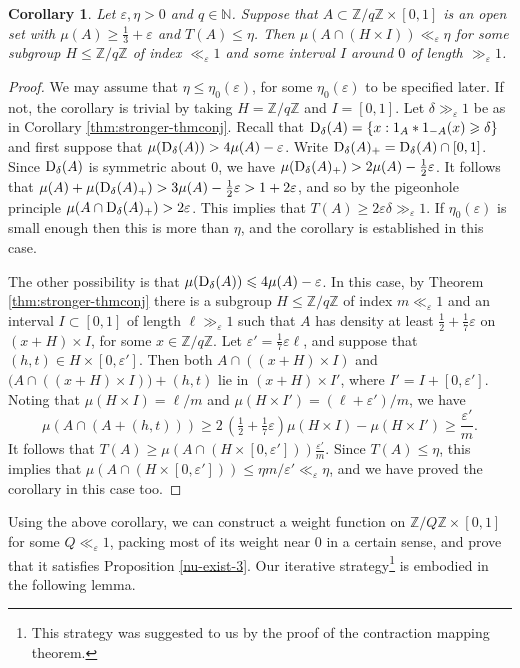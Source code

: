 \documentclass[10pt,reqno]{amsart}
\newtheorem{corollary}[theorem]{Corollary}
\theoremstyle{definition}
\theoremstyle{remark}
\renewcommand{\leq}{\leqslant}
\renewcommand{\geq}{\geqslant}
\def\Z{\mathbb{Z}}
\def\N{\mathbb{N}}
\def\eps{\varepsilon}
\numberwithin{equation}{section}
\begin{document}
\begin{corollary}\label{cor4.2}
Let $\eps,\eta > 0$ and $q \in \N$. Suppose that $A\subset\Z/q\Z\times[0,1]$ is an open set with $\mu(A)\geq\frac{1}{3} + \eps$ and $T(A)\leq\eta$. Then $\mu(A\cap (H\times I)) \ll_{\eps} \eta$ for some subgroup $H\leq\Z/q\Z$ of index $\ll_{\eps} 1$ and some interval $I$ around $0$ of length $\gg_{\eps} 1$.
\end{corollary}
\begin{proof} We may assume that $\eta \leq \eta_0(\eps)$, for some $\eta_0(\eps)$ to be specified later. If not, the corollary is trivial by taking $H = \Z/q\Z$ and $I = [0,1]$. Let $\delta\gg_\eps 1$ be as in Corollary \ref{thm:stronger-thmconj}. Recall that $\Sym_{\delta}(A) = \{ x: 1_A\ast1_{-A}(x)\geq\delta\}$ and first suppose that $\mu(\Sym_{\delta}(A))> 4\mu(A)-\eps$. Write $\operatorname{D}_{\delta}(A)_+ = \operatorname{D}_{\delta}(A) \cap [0,1]$. Since $\operatorname{D}_{\delta}(A)$ is symmetric about $0$, we have $\mu(\Sym_{\delta}(A)_+) >  2\mu(A) - \frac{1}{2}\eps$. It follows that 
$\mu(A) + \mu(\Sym_{\delta}(A)_+) > 3 \mu(A) - \frac{1}{2}\eps > 1 +2\eps$, and so by the pigeonhole principle $\mu(A \cap \Sym_{\delta}(A)_+) > 2\eps$. This implies that $T(A) \geq 2\eps \delta \gg_{\eps} 1$. If $\eta_0(\eps)$ is small enough then this is more than $\eta$, and the corollary is established in this case.

The other possibility is that $\mu(\Sym_{\delta}(A)) \leq 4\mu(A) - \eps$. In this case, by Theorem \ref{thm:stronger-thmconj} there is a subgroup $H \leq \Z/q\Z$ of index $m \ll_\eps 1$ and an interval $I \subset [0,1]$ of length $\ell \gg_{\eps} 1$ such that $A$ has density at least $\frac{1}{2} + \tfrac{1}{7}\eps$ on $(x + H) \times I$, for some $x \in \Z/q\Z$. Let $\eps' = \tfrac{1}{7}\eps \ell$, and suppose that $(h, t) \in H \times [0,\eps']$. Then both $A \cap ((x + H) \times I)$ and $\big( A \cap ((x + H) \times I)\big) + (h, t)$ lie in $(x + H) \times I'$, where $I' = I + [0,\eps']$. Noting that $\mu(H \times I) = \ell/m$ and $\mu(H \times I') = (\ell + \eps')/m$, we have \[\mu(A \cap (A + (h, t)))  \geq 2\, \left(\tfrac{1}{2} + \tfrac{1}{7}\eps\right) \mu(H \times I) - \mu(H \times I') \geq \frac{\eps'}{m}.\] It follows that $T(A) \geq \mu(A \cap (H \times [0,\eps'])) \frac{\eps'}{m}$. Since $T(A) \leq \eta$, this implies that $\mu(A \cap (H \times [0,\eps'])) \leq \eta m/\eps' \ll_{\eps} \eta$, and we have proved the corollary in this case too.
\end{proof}

Using the above corollary, we can construct a weight function on $\Z/Q\Z\times[0,1]$ for some $Q\ll_\eps 1$, packing most of its weight near $0$ in a certain sense, and prove that it satisfies Proposition \ref{nu-exist-3}. Our iterative strategy\footnote{This strategy was suggested to us by the proof of the contraction mapping theorem.} is embodied in the following lemma.
\end{document}
